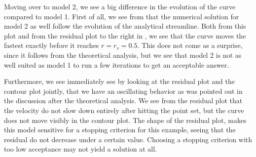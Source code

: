 \newpage
Moving over to model 2, we see a big difference in the evolution of the curve compared to model 1. First of all, we see from  that the numerical solution for model 2 as well follow the evolution of the analytical streamline. Both from this plot and from the residual plot to the right in , we see that the curve moves the fastest exactly before it reaches $r=r_v=0.5$. This does not come as a surprise, since it follows from the theoretical analysis, but we see that model 2 is not as well suited as model 1 to run a few iterations to get an acceptable answer. 

Furthermore, we see immediately see by looking at the residual plot and the contour plot jointly, that we have an oscillating behavior as was pointed out in the discussion after the theoretical analysis. We see from the residual plot that the velocity do not slow down entirely after hitting the point set, but the curve does not move visibly in the contour plot. The shape of the residual plot, makes this model sensitive for a stopping criterion for this example, seeing that the residual do not decrease under a certain value. Choosing a stopping criterion with too low acceptance may not yield a solution at all.


